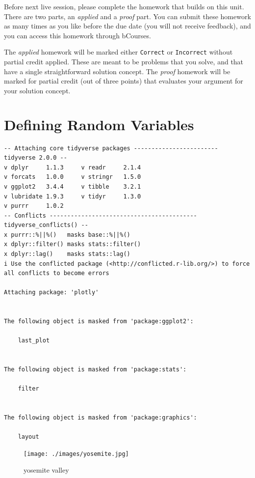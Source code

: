 \documentclass[
  letterpaper,
  DIV=11,
  numbers=noendperiod]{scrreprt}
\begin{document}
Before next live session, please complete the homework that builds on
this unit. There are two parts, an \emph{applied} and a \emph{proof}
part. You can submit these homework as many times as you like before the
due date (you will not receive feedback), and you can access this
homework through bCourses.

The \emph{applied} homework will be marked either \texttt{Correct} or
\texttt{Incorrect} without partial credit applied. These are meant to be
problems that you solve, and that have a single straightforward solution
concept. The \emph{proof} homework will be marked for partial credit
(out of three points) that evaluates your argument for your solution
concept.

\chapter{Defining Random Variables}\label{defining-random-variables}

\begin{verbatim}
-- Attaching core tidyverse packages ------------------------ tidyverse 2.0.0 --
v dplyr     1.1.3     v readr     2.1.4
v forcats   1.0.0     v stringr   1.5.0
v ggplot2   3.4.4     v tibble    3.2.1
v lubridate 1.9.3     v tidyr     1.3.0
v purrr     1.0.2     
-- Conflicts ------------------------------------------ tidyverse_conflicts() --
x purrr::%||%()   masks base::%||%()
x dplyr::filter() masks stats::filter()
x dplyr::lag()    masks stats::lag()
i Use the conflicted package (<http://conflicted.r-lib.org/>) to force all conflicts to become errors

Attaching package: 'plotly'


The following object is masked from 'package:ggplot2':

    last_plot


The following object is masked from 'package:stats':

    filter


The following object is masked from 'package:graphics':

    layout
\end{verbatim}

\begin{figure}[H]

{\centering \texttt{[image: ./images/yosemite.jpg]}

}

\caption{yosemite valley}

\end{figure}%
\end{document}

